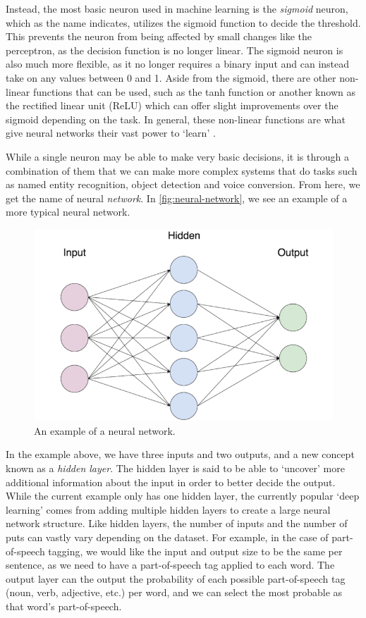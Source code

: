 \documentclass
[
    a4paper,
    twoside,
    12pt,
]
{report}
\begin{document}
Instead, the most basic neuron used in machine learning is the
\emph{sigmoid} neuron, which as the name indicates, utilizes the sigmoid
function to decide the threshold. This prevents the neuron from being
affected by small changes like the perceptron, as the decision function
is no longer linear. The sigmoid neuron is also much more flexible, as
it no longer requires a binary input and can instead take on any values
between 0 and 1. Aside from the sigmoid, there are other non-linear
functions that can be used, such as the tanh function or another known
as the rectified linear unit (ReLU) which can offer slight improvements
over the sigmoid depending on the task. In general, these non-linear
functions are what give neural networks their vast power to `learn'
\parencite{nielsen2015}.

While a single neuron may be able to make very basic decisions, it is
through a combination of them that we can make more complex systems that
do tasks such as named entity recognition, object detection and voice
conversion. From here, we get the name of neural \emph{network}. In
\autoref{fig:neural-network}, we see an example of a more typical neural
network.

\begin{figure}[]
\centering
\includegraphics[scale=0.35]{img/neural-network.png}
\caption{An example of a neural network.}
\label{fig:neural-network}
\end{figure}

In the example above, we have three inputs and two outputs, and a new
concept known as a \emph{hidden layer}. The hidden layer is said to be
able to `uncover' more additional information about the input in order
to better decide the output. While the current example only has one
hidden layer, the currently popular `deep learning' comes from adding
multiple hidden layers to create a large neural network structure. Like
hidden layers, the number of inputs and the number of puts can vastly
vary depending on the dataset. For example, in the case of
part-of-speech tagging, we would like the input and output size to be
the same per sentence, as we need to have a part-of-speech tag applied
to each word. The output layer can the output the probability of each
possible part-of-speech tag (noun, verb, adjective, etc.) per word, and
we can select the most probable as that word's part-of-speech.
\end{document}
